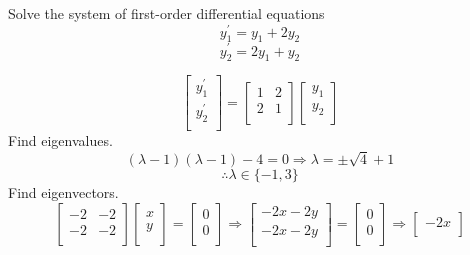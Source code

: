 \begin{exercise}
    Solve the system of first-order differential equations
    \[
        y_1^{\prime} =y_1 + 2y_2
    \]
    \[
        y_2^{\prime} = 2y_1 +y_2
    \]
\end{exercise}
\begin{solution}
    \[
        \begin{bmatrix}
             y_1^{\prime}  \\
              y_2^{\prime} \\
        \end{bmatrix} = \begin{bmatrix}
            1 &2   \\
             2&1   \\
        \end{bmatrix} \begin{bmatrix}
             y_1 \\
              y_2\\
        \end{bmatrix}
    \]
    Find eigenvalues.
    \[
        (\lambda -1)(\lambda -1)-4 = 0 \Longrightarrow \lambda =\pm\sqrt{4}+1
    \]
    \[
        \therefore \lambda \in \{ -1,3 \} 
    \]
    Find eigenvectors.
    \[
        \begin{bmatrix}
             -2&-2   \\
             -2&-2   \\
        \end{bmatrix} \begin{bmatrix}
             x \\
             y \\
        \end{bmatrix} = \begin{bmatrix}
             0 \\
             0 \\
        \end{bmatrix} \Longrightarrow \begin{bmatrix}
             -2x-2y \\
              -2x-2y\\
        \end{bmatrix} = \begin{bmatrix}
             0 \\
             0 \\
        \end{bmatrix} \Longrightarrow \begin{bmatrix}
             -2x \\

\end{bmatrix}\]
\end{solution}
